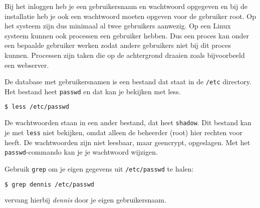 Bij het inloggen heb je een gebruikersnaam en wachtwoord opgegeven en bij de installatie heb je ook een wachtwoord moeten opgeven voor de gebruiker root. Op het systeem zijn dus minimaal al twee gebruikers aanwezig. Op een Linux systeem kunnen ook processen een gebruiker hebben. Dus een proces kan onder een bepaalde gebruiker werken zodat andere gebruikers niet bij dit proces kunnen. Processen zijn taken die op de achtergrond draaien zoals bijvoorbeeld een webserver.

De database met gebruikersnamen is een bestand dat staat in de \texttt{/etc} directory. Het bestand heet \texttt{passwd} en dat kan je bekijken met less.

\begin{lstlisting}[language=bash]
$ less /etc/passwd
\end{lstlisting}

De wachtwoorden staan in een ander bestand, dat heet \texttt{shadow}. Dit bestand kan je met \texttt{less} niet bekijken, omdat alleen de beheerder (root) hier rechten voor heeft. De wachtwoorden zijn niet leesbaar, maar geencrypt, opgeslagen. Met het \texttt{passwd}-commando kan je je wachtwoord wijzigen.

Gebruik \texttt{grep} om je eigen gegevens uit \texttt{/etc/passwd} te halen:
\begin{lstlisting}[language=bash]
$ grep dennis /etc/passwd
\end{lstlisting}
vervang hierbij \textsl{dennis} door je eigen gebruikersnaam.

